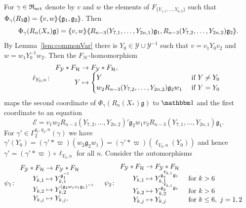 \documentclass[a4paper,11pt]{amsart}
\begin{document}
For $\gamma\in\mathfrak{R}_{\operatorname{act}}$ denote by $v$ and $w$ the elements of $F_{\{Y_
{1,1},\ldots,Y_{6,2}\}}$ such
that $\Phi_\gamma(R_3 \mathfrak g)=\langle\negthickspace\langle v,w\rangle\negthickspace\rangle\langle\negthickspace\langle\mathfrak g_1, \mathfrak
g_2\rangle\negthickspace\rangle$. 
Then \[\Phi_\gamma(R_n(X_*) \mathfrak g)=\langle\negthickspace\langle v,w\rangle\negthickspace\rangle
\langle\negthickspace\langle R_{n-3}(Y_{7,1},\ldots,Y_{2n,1})\mathfrak g_1,
R_{n-3}(Y_{7,2},\ldots,Y_{2n,2})\mathfrak g_2\rangle\negthickspace\rangle.\] By Lemma~\ref{lem:commonVar}
there is $Y_0 \in \mathcal{Y}\cup 
\mathcal{Y}^{-1}$ such that $v=v_1Y_0v_2$ and $w=w_1Y_0^{-1}w_2$. Then the
$F_{\mathcal{H}}$-homomorphism
\[\ell_{Y_0,n}\colon\begin{array}{r@{\;}l}
                    F_{\mathcal{Y}}*F_{\mathcal H}&\to F_{\mathcal{Y}}*F_
                    {\mathcal H},\\
                    Y &\mapsto \begin{cases}
    Y &\text{ if } Y\neq {Y_0} \\
    w_2R_{n-3}(Y_{7,2},\ldots,Y_{2n,2})\mathfrak g_2 w_1&\text{ if }Y= {Y_0} 
  \end{cases}\end{array}
\]
maps the second coordinate of $\Phi_\gamma(R_n(X_*)\mathfrak{g})$ to $\id$
and the first coordinate to an equation 
\[\mathcal{E}=v_1w_2R_{n-3}(Y_{7,2},\ldots,Y_{2n,2})'\mathfrak g_2w_1v_2R_
{n-3}(Y_{7,1},\ldots,Y_{2n,1}) \mathfrak g_1.\]
For $\gamma'\in \Gamma_2^{q_1,q_2,n}(\gamma)$ we have
$\gamma'(Y_0)=({\gamma'*\varpi})(w_2\mathfrak g_2w_1)=(
{\gamma'*\varpi})(\ell_{Y_0,n}(Y_0))$ and hence
$\gamma'=(\gamma'*\varpi)\circ \ell_{Y_0,n}$ for all $n$. 
Consider the automorphisms
\begin{align*}
  \psi_1\colon&\begin{array}{r@{\;}l}
                 F_{\mathcal{Y}}*F_{\mathcal{H}} &\to F_{\mathcal{Y}}*F_
                 {\mathcal H}\\
                 Y_{k,1} &\mapsto Y_{k,1}^{\mathfrak g_1^{-1}}\\
                 Y_{k,2} &\mapsto Y_{k,2}^{(\mathfrak g_2w_1v_1\mathfrak g_1)^{-1}}\\
                 Y_{k,j} &\mapsto Y_{k,j},
              \end{array} &
  \psi_2\colon&\begin{array}{r@{\;}ll}
                 F_{\mathcal{Y}}*F_{\mathcal{H}} &\to F_{\mathcal{Y}}*F_
                 {\mathcal{H}}\\
                 Y_{k,1} &\mapsto Y_{k,1}^{\mathfrak g_2^{Y_{6,1}}\mathfrak g_1}&\text{ for
                 } k> 6\\
                 Y_{k,2} &\mapsto Y_{k,2}^{\mathfrak g_2^{Y_{6,1}}\mathfrak g_1}&\text{ for
                 } k> 6\\
                 Y_{k,j} &\mapsto Y_{k,j} &\text{ for } k\leq 6,\ j=1,2
               \end{array}
\end{align*}
\end{document}
